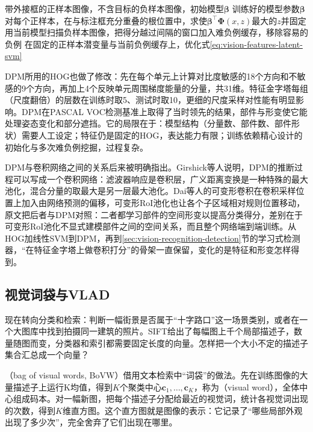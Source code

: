 \begin{algorithm}
  \label{alg:vision-features-latent-svm}
  \begin{algorithmic}[1]
    \Require 带外接框的正样本图像，不含目标的负样本图像，初始模型$\bm\beta$
    \Ensure 训练好的模型参数$\bm\beta$
      \State 对每个正样本，在与标注框充分重叠的根位置中，求使$\bm\beta^{\top}\bm\Phi(x,z)$最大的$z$并固定
      \State 用当前模型扫描负样本图像，把得分越过间隔的窗口加入难负例缓存，移除容易的负例
      \State 在固定的正样本潜变量与当前负例缓存上，优化式\eqref{eq:vision-features-latent-svm}
    \EndFor
  \end{algorithmic}
\end{algorithm}

DPM所用的HOG也做了修改：先在每个单元上计算对比度敏感的18个方向和不敏感的9个方向，再加上4个反映单元周围梯度能量的分量，共31维。特征金字塔每组（尺度翻倍）的层数在训练时取5、测试时取10，更细的尺度采样对性能有明显影响。DPM在PASCAL VOC检测基准上取得了当时领先的结果，部件与形变使它能处理姿态变化和部分遮挡。它的局限在于：模型结构（分量数、部件数、部件形状）需要人工设定；特征仍是固定的HOG，表达能力有限；训练依赖精心设计的初始化与多次难负例挖掘，过程复杂。

DPM与卷积网络之间的关系后来被明确指出。Girshick等人说明，DPM的推断过程可以写成一个卷积网络：滤波器响应是卷积层，广义距离变换是一种特殊的最大池化，混合分量的取最大是另一层最大池化。Dai等人的可变形卷积在卷积采样位置上加入由网络预测的偏移，可变形RoI池化也让各个子区域相对规则位置移动，原文把后者与DPM对照：二者都学习部件的空间形变以提高分类得分，差别在于可变形RoI池化不显式建模部件之间的空间关系，而且整个网络端到端训练。从HOG加线性SVM到DPM，再到\ref{sec:vision-recognition-detection}节的学习式检测器，“在特征金字塔上做卷积打分”的骨架一直保留，变化的是特征和形变怎样得到。

\subsection{视觉词袋与VLAD}
\label{sec:vision-features-bovw}

现在转向分类和检索：判断一幅街景是否属于“十字路口”这一场景类别，或者在一个大图库中找到拍摄同一建筑的照片。SIFT给出了每幅图上千个局部描述子，数量随图而变，分类器和索引都需要固定长度的向量。怎样把一个大小不定的描述子集合汇总成一个向量？

（bag of visual words, BoVW）借用文本检索中“词袋”的做法。先在训练图像的大量描述子上运行K均值，得到$K$个聚类中心$\bm c_1,\ldots,\bm c_K$，称为（visual word），全体中心组成码本。对一幅新图，把每个描述子分配给最近的视觉词，统计各视觉词出现的次数，得到$K$维直方图。这个直方图就是图像的表示：它记录了“哪些局部外观出现了多少次”，完全舍弃了它们出现在哪里。

